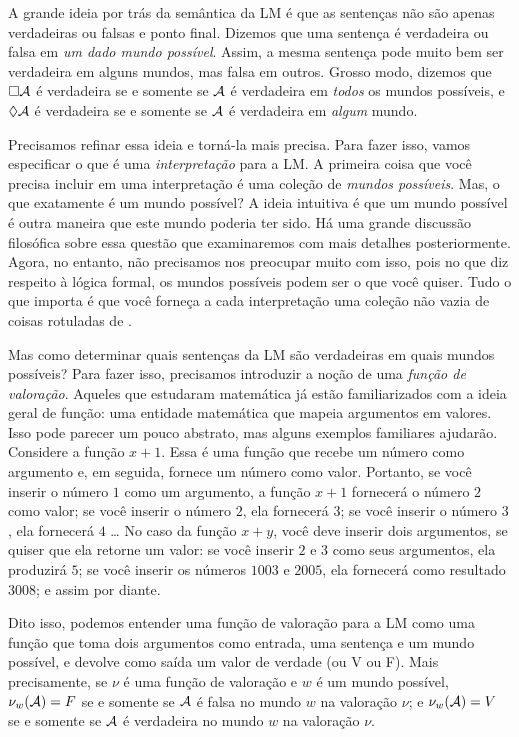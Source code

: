 A grande ideia por trás da semântica da LM é que as sentenças não são apenas verdadeiras ou falsas e ponto final.  Dizemos que uma  sentença é verdadeira ou falsa em \emph{um dado mundo possível}. Assim,  a mesma sentença pode muito bem ser verdadeira em alguns mundos,  mas falsa em outros. Grosso modo, dizemos que $\Box \mathcal{A}$ é verdadeira   se e somente se $\mathcal{A}$ é verdadeira em \emph{todos} os mundos possíveis, e $\Diamond\mathcal{A}$ é verdadeira se e somente se  $\mathcal{A}$ é verdadeira em \emph{algum} mundo.

Precisamos refinar essa ideia e torná-la mais precisa. Para fazer isso,  vamos especificar o que é uma  \emph{interpretação} para a LM. A primeira coisa que você precisa incluir em uma interpretação é uma coleção de \emph{mundos possíveis}. Mas, o que exatamente é um mundo possível? A ideia intuitiva é que um mundo possível é outra maneira que este mundo poderia ter sido. Há uma grande discussão filosófica sobre  essa questão que examinaremos com mais detalhes posteriormente. Agora, no entanto,  não precisamos nos preocupar muito com isso, pois no que diz respeito à lógica formal, os mundos possíveis podem ser o que você quiser. Tudo o que importa é que você forneça a cada interpretação uma coleção não vazia de coisas rotuladas  de  .


Mas como determinar quais sentenças da LM são verdadeiras em quais mundos possíveis? Para fazer isso, precisamos introduzir a noção de uma \emph{função de valoração}. Aqueles que estudaram matemática já estão familiarizados com a ideia geral de função: uma entidade matemática que mapeia argumentos em valores. Isso pode parecer um pouco abstrato, mas alguns exemplos familiares ajudarão. Considere a função $x + 1$. Essa é uma função que recebe um número como argumento e, em seguida, fornece um número como valor. Portanto, se você inserir o número $1$ como um argumento, a função $x + 1$ fornecerá o número $2$ como valor; se você inserir o número  $2$, ela fornecerá $3$; se você inserir o número  $3$, ela fornecerá $4$ \dots{}  No caso da função $x + y$, você deve inserir dois argumentos, se quiser que ela retorne um valor: se você inserir $2$ e $3$ como seus argumentos, ela produzirá $5$; se você inserir os números  $1003$ e $2005$, ela fornecerá como resultado $3008$; e assim por diante.

Dito isso, podemos entender uma função de valoração para a LM como uma função que toma dois argumentos como entrada, uma sentença e um mundo possível, e devolve como saída um valor de verdade (ou V ou F). 
Mais precisamente, se $\nu$   é uma função de valoração  e $w$ é um mundo possível,   $\nu_w(\mathcal{A})=F$  se e somente se $\mathcal{A}$ é falsa no mundo $w$ na valoração $\nu$; e $\nu_w(\mathcal{A})=V$  se e somente se $\mathcal{A}$  é verdadeira no mundo $w$ na valoração $\nu$.

